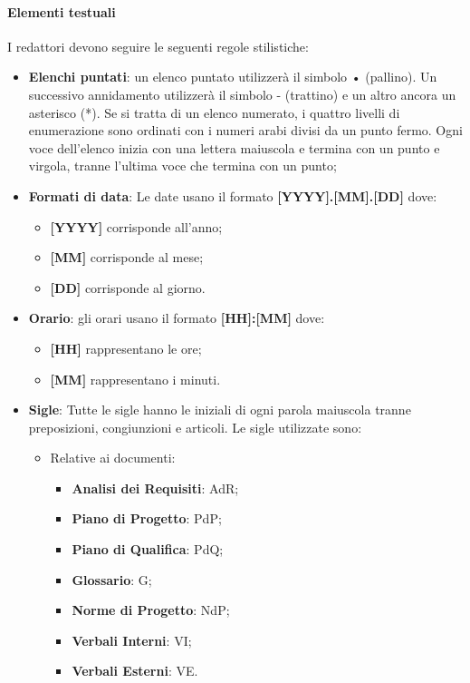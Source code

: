 \paragraph{Elementi testuali}
I redattori devono seguire le seguenti regole stilistiche:
\begin{itemize}
\item \textbf{Elenchi puntati}: un elenco puntato utilizzerà il simbolo • (pallino). Un successivo annidamento utilizzerà il simbolo - (trattino) e un altro ancora un asterisco (*). Se si tratta di un elenco numerato, i quattro livelli di enumerazione sono ordinati con i numeri arabi divisi da un punto fermo. Ogni voce dell’elenco inizia con una lettera maiuscola e termina con un punto e virgola, tranne l'ultima voce che termina con un punto;

\item \textbf{Formati di data}: Le date usano il formato \textbf{[YYYY].[MM].[DD]} dove:
    \begin{itemize}
    \item \textbf{[YYYY]} corrisponde all’anno;
    \item \textbf{[MM]} corrisponde al mese;
    \item \textbf{[DD]} corrisponde al giorno.
    \end{itemize}

\item \textbf{Orario}: gli orari usano il formato \textbf{[HH]:[MM]} dove:
    \begin{itemize}
    \item \textbf{[HH]} rappresentano le ore;
    \item \textbf{[MM]} rappresentano i minuti.
    \end{itemize}

\item \textbf{Sigle}: Tutte le sigle hanno le iniziali di ogni parola maiuscola tranne preposizioni, congiunzioni e articoli. Le sigle utilizzate sono:
    \begin{itemize}
    \item Relative ai documenti:
        \begin{itemize}
        \item \textbf{Analisi dei Requisiti}: AdR;
        \item \textbf{Piano di Progetto}: PdP;
        \item \textbf{Piano di Qualifica}: PdQ;
        \item \textbf{Glossario}: G;
        \item \textbf{Norme di Progetto}: NdP;
        \item \textbf{Verbali Interni}: VI;
        \item \textbf{Verbali Esterni}: VE.
        \end{itemize}
    

\end{itemize}
\end{itemize}
